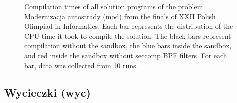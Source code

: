 \documentclass[en]{pracamgr}
\begin{document}
\begin{appendices}
\begin{figure}[H]
\caption{Compilation times of all solution programs of the problem Modernizacja autostrady (mod) from the finals of XXII Polish Olimpiad in Informatics. Each bar represents the distribution of the CPU time it took to compile the solution. The black bars represent compilation without the sandbox, the blue bars inside the sandbox, and red inside the sandbox without seccomp BPF filters. For each bar, data was collected from 10 runs.}
\label{figure:mod_compilation_cpu_time}
\end{figure}
\subsection{Wycieczki (wyc)}


\end{appendices}
\end{document}
